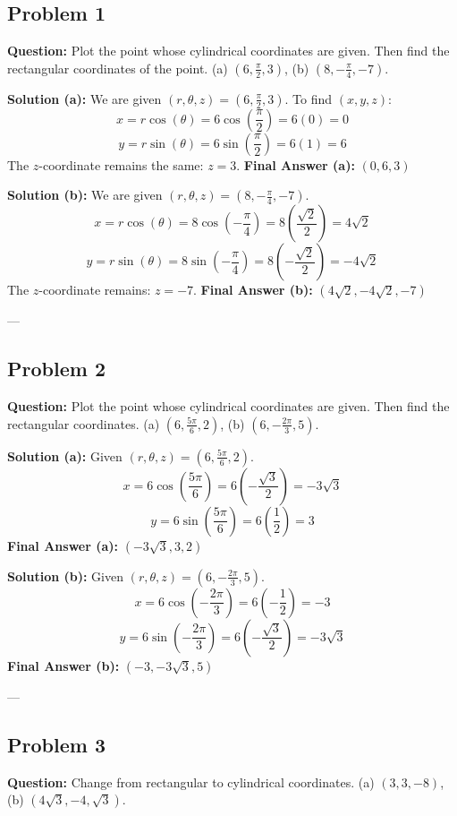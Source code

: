 \documentclass[11pt]{article}
\begin{document}
\subsection*{Problem 1}
\textbf{Question:} Plot the point whose cylindrical coordinates are given. Then find the rectangular coordinates of the point. (a) $(6, \frac{\pi}{2}, 3)$, (b) $(8, -\frac{\pi}{4}, -7)$.

\textbf{Solution (a):}
We are given $(r, \theta, z) = \left(6, \frac{\pi}{2}, 3\right)$.
To find $(x, y, z)$:
\[ x = r \cos(\theta) = 6 \cos\left(\frac{\pi}{2}\right) = 6(0) = 0 \]
\[ y = r \sin(\theta) = 6 \sin\left(\frac{\pi}{2}\right) = 6(1) = 6 \]
The $z$-coordinate remains the same: $z = 3$.
\textbf{Final Answer (a):} $(0, 6, 3)$

\textbf{Solution (b):}
We are given $(r, \theta, z) = \left(8, -\frac{\pi}{4}, -7\right)$.
\[ x = r \cos(\theta) = 8 \cos\left(-\frac{\pi}{4}\right) = 8 \left(\frac{\sqrt{2}}{2}\right) = 4\sqrt{2} \]
\[ y = r \sin(\theta) = 8 \sin\left(-\frac{\pi}{4}\right) = 8 \left(-\frac{\sqrt{2}}{2}\right) = -4\sqrt{2} \]
The $z$-coordinate remains: $z = -7$.
\textbf{Final Answer (b):} $(4\sqrt{2}, -4\sqrt{2}, -7)$

---

\subsection*{Problem 2}
\textbf{Question:} Plot the point whose cylindrical coordinates are given. Then find the rectangular coordinates. (a) $(6, \frac{5\pi}{6}, 2)$, (b) $(6, -\frac{2\pi}{3}, 5)$.

\textbf{Solution (a):}
Given $(r, \theta, z) = \left(6, \frac{5\pi}{6}, 2\right)$.
\[ x = 6 \cos\left(\frac{5\pi}{6}\right) = 6 \left(-\frac{\sqrt{3}}{2}\right) = -3\sqrt{3} \]
\[ y = 6 \sin\left(\frac{5\pi}{6}\right) = 6 \left(\frac{1}{2}\right) = 3 \]
\textbf{Final Answer (a):} $(-3\sqrt{3}, 3, 2)$

\textbf{Solution (b):}
Given $(r, \theta, z) = \left(6, -\frac{2\pi}{3}, 5\right)$.
\[ x = 6 \cos\left(-\frac{2\pi}{3}\right) = 6 \left(-\frac{1}{2}\right) = -3 \]
\[ y = 6 \sin\left(-\frac{2\pi}{3}\right) = 6 \left(-\frac{\sqrt{3}}{2}\right) = -3\sqrt{3} \]
\textbf{Final Answer (b):} $(-3, -3\sqrt{3}, 5)$

---

\subsection*{Problem 3}
\textbf{Question:} Change from rectangular to cylindrical coordinates. (a) $(3, 3, -8)$, (b) $(4\sqrt{3}, -4, \sqrt{3})$.
\end{document}
